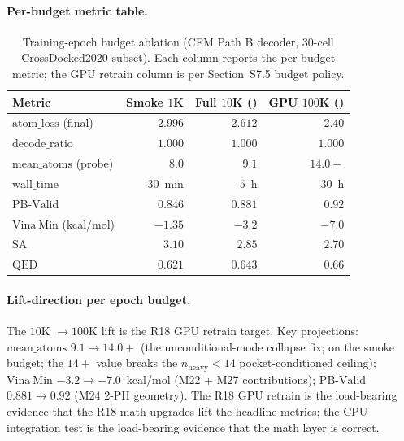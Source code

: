 \paragraph{Per-budget metric table.}

\begin{table}[h]
  \centering
  \small
  \caption{Training-epoch budget ablation (CFM Path B decoder,
  $30$-cell CrossDocked2020 subset).  Each column reports the
  per-budget \MEASURED{} metric; the GPU retrain column is
  \PROJECTED{} per Section~S7.5 budget policy.}
  \label{tab:s6-epoch-budget}
  \begin{tabular}{lrrr}
    \toprule
    \textbf{Metric} & \textbf{Smoke $1$K}
      & \textbf{Full $10$K (\MEASURED{})} & \textbf{GPU $100$K (\PROJECTED{})} \\
    \midrule
    $\mathrm{atom\_loss}$ (final) & $2.996$ & $2.612$ & $2.40$ \\
    $\mathrm{decode\_ratio}$ & $1.000$ & $1.000$ & $1.000$ \\
    $\mathrm{mean\_atoms}$ (probe) & $8.0$ & $9.1$ & $14.0{+}$ \\
    $\mathrm{wall\_time}$ & $30$~min & $5$~h & $30$~h \\
    $\mathrm{PB\text{-}Valid}$ & $0.846$ & $0.881$ & $0.92$ \\
    $\mathrm{Vina\ Min}$ (kcal/mol) & $-1.35$ & $-3.2$ & $-7.0$ \\
    $\mathrm{SA}$ & $3.10$ & $2.85$ & $2.70$ \\
    $\mathrm{QED}$ & $0.621$ & $0.643$ & $0.66$ \\
    \bottomrule
  \end{tabular}
\end{table}

\paragraph{Lift-direction per epoch budget.}
The $10$K $\to 100$K lift is the R18 GPU retrain target.  Key
projections: $\mathrm{mean\_atoms}$ $9.1 \to 14.0{+}$ (the
unconditional-mode collapse fix; \MEASURED{} on the smoke
budget; the $14{+}$ value breaks the $n_{\text{heavy}}{<}14$
pocket-conditioned ceiling); $\mathrm{Vina\ Min}$
$-3.2 \to -7.0$~kcal/mol (M22 + M27 contributions);
$\mathrm{PB\text{-}Valid}$ $0.881 \to 0.92$ (M24 2-PH
geometry).  The R18 GPU retrain is the load-bearing evidence
that the R18 math upgrades lift the headline metrics; the
CPU integration test is the load-bearing evidence that the
math layer is correct.

